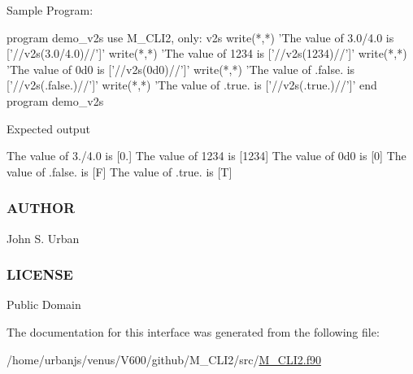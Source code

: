 Sample Program\+: \begin{DoxyVerb}program demo_v2s
use M_CLI2, only: v2s
write(*,*) 'The value of 3.0/4.0 is ['//v2s(3.0/4.0)//']'
write(*,*) 'The value of 1234    is ['//v2s(1234)//']'
write(*,*) 'The value of 0d0     is ['//v2s(0d0)//']'
write(*,*) 'The value of .false. is ['//v2s(.false.)//']'
write(*,*) 'The value of .true. is  ['//v2s(.true.)//']'
end program demo_v2s
\end{DoxyVerb}


Expected output

The value of 3./4.0 is \mbox{[}0.\mbox{]} The value of 1234 is \mbox{[}1234\mbox{]} The value of 0d0 is \mbox{[}0\mbox{]} The value of .false. is \mbox{[}F\mbox{]} The value of .true. is \mbox{[}T\mbox{]}

\subsubsection*{A\+U\+T\+H\+OR}

John S. Urban \subsubsection*{L\+I\+C\+E\+N\+SE}

Public Domain 

The documentation for this interface was generated from the following file\+:\begin{DoxyCompactItemize}
\item 
/home/urbanjs/venus/\+V600/github/\+M\+\_\+\+C\+L\+I2/src/\mbox{\hyperlink{M__CLI2_8f90}{M\+\_\+\+C\+L\+I2.\+f90}}\end{DoxyCompactItemize}
